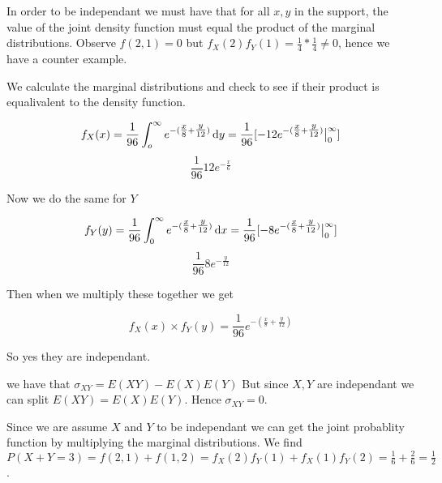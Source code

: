 \documentclass[11pt,largemargins]{homework}
\begin{document}
\maketitle

\question
In order to be independant we must have that for all $x, y$ in the support, the value of the joint density function must equal the 
product of the marginal distributions. Observe $f(2,1) = 0$ but $f_X(2)f_Y(1) = \frac{1}{4} * \frac{1}{4} \neq 0$, hence we have 
a counter example. 


\question 
\begin{alphaparts}
    \questionpart 
    We calculate the marginal distributions and check to see if their product is equalivalent to the density function. 

    \[f_X(x) = \frac{1}{96} \int_o^\infty e^{-(\tfrac{x}{8} + \tfrac{y}{12})} \dif y = \frac{1}{96}[-12e^{-(\tfrac{x}{8} + \tfrac{y}{12})}\big|_0^\infty] \] 
    \[ \frac{1}{96} 12e^{-\frac{x}{6}} \] 

    Now we do the same for $Y$ 

    \[f_Y(y) = \frac{1}{96}\int_0^\infty e^{-(\tfrac{x}{8} + \tfrac{y}{12})} \dif x =  \frac{1}{96}[-8e^{-(\tfrac{x}{8} + \tfrac{y}{12})}\big|_0^\infty] \] 
    \[\frac{1}{96}8e^{-\frac{y}{12}} \] 


    Then when we multiply these together we get 

    \[ f_X(x) \times f_Y(y) = \frac{1}{96}e^{-(\tfrac{x}{8} + \tfrac{y}{12})} \] 

    So yes they are independant. 

    \questionpart 
    we have that $\sigma_{XY} = E(XY) - E(X)E(Y)$ But since $X, Y$ are independant we can split $E(XY) = E(X)E(Y)$. Hence 
    $\sigma_{XY} = 0$. 



    
\end{alphaparts}

\question
Since we are assume $X$ and $Y$ to be independant we can get the joint probablity function by multiplying the marginal distributions. 
We find $P(X + Y = 3) = f(2, 1) + f(1, 2) = f_X(2)f_Y(1) + f_X(1)f_Y(2) = \frac{1}{6} + \frac{2}{6} = \frac{1}{2}$. 
\end{document}
